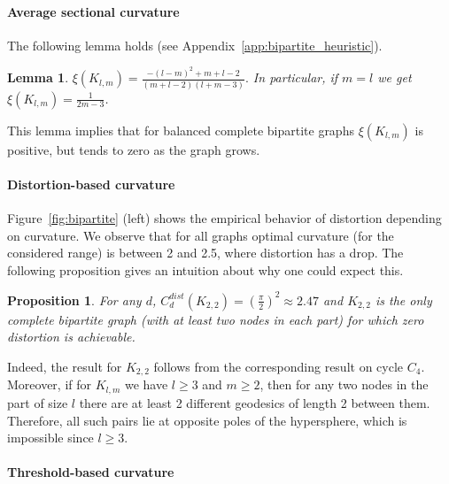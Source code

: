 \documentclass{article} %
\newtheorem{lemma}[theorem]{Lemma}
\newtheorem{proposition}[theorem]{Proposition}
\begin{document}
\paragraph{Average sectional curvature} 
The following lemma holds (see Appendix~\ref{app:bipartite_heuristic}).

\begin{lemma}\label{lem:bipartite_heuristic}
$
\xi({K_{l,m}}) = \frac{-(l - m)^2 + m + l - 2}{(m+l-2)(l+m-3)}.
$
In particular, if $m = l$ we get $\xi({K_{l,m}}) = \frac{1}{2m - 3}$. 
\end{lemma}
This lemma implies that for balanced complete bipartite graphs $\xi({K_{l,m}})$ is positive, but tends to zero as the graph grows.



\paragraph{Distortion-based curvature} 

Figure~\ref{fig:bipartite} (left) shows the empirical behavior of distortion depending on curvature. We observe that for all graphs optimal curvature (for the considered range) is between 2 and 2.5, where distortion has a drop. 
The following proposition gives an intuition about why one could expect this. 

\begin{proposition}\label{prop:bipartite_distortion}
For any $d$, $C_d^{dist}(K_{2,2}) = \left(\frac{\pi}{2}\right)^2 \approx 2.47$ and $K_{2,2}$ is the only complete bipartite graph (with at least two nodes in each part) for which zero distortion is achievable.
\end{proposition}

Indeed, the result for $K_{2,2}$ follows from the corresponding result on cycle $C_4$. Moreover, if for $K_{l,m}$ we have $l \ge 3$ and $m \ge 2$, then for any two nodes in the part of size $l$ there are at least 2 different geodesics of length 2 between them. Therefore, all such pairs lie at opposite poles of the hypersphere, which is impossible since $l \ge 3$.


\paragraph{Threshold-based curvature} 
 
\end{document}
